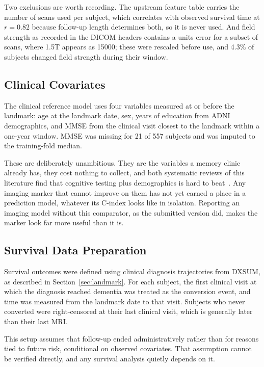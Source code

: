 \documentclass[blue]{ludusofficial}  %
\begin{document}
Two exclusions are worth recording. The upstream feature table carries the number of scans used per subject, which correlates with observed survival time at $r = 0.82$ because follow-up length determines both, so it is never used. And field strength as recorded in the DICOM headers contains a units error for a subset of scans, where 1.5T appears as 15000; these were rescaled before use, and 4.3\% of subjects changed field strength during their window.

\subsection{Clinical Covariates}

The clinical reference model uses four variables measured at or before the landmark: age at the landmark date, sex, years of education from ADNI demographics, and MMSE from the clinical visit closest to the landmark within a one-year window. MMSE was missing for 21 of 557 subjects and was imputed to the training-fold median.

These are deliberately unambitious. They are the variables a memory clinic already has, they cost nothing to collect, and both systematic reviews of this literature find that cognitive testing plus demographics is hard to beat~\cite{ansart2021predicting,grueso2021machine}. Any imaging marker that cannot improve on them has not yet earned a place in a prediction model, whatever its C-index looks like in isolation. Reporting an imaging model without this comparator, as the submitted version did, makes the marker look far more useful than it is.

\subsection{Survival Data Preparation}

Survival outcomes were defined using clinical diagnosis trajectories from DXSUM, as described in Section~\ref{sec:landmark}. For each subject, the first clinical visit at which the diagnosis reached dementia was treated as the conversion event, and time was measured from the landmark date to that visit. Subjects who never converted were right-censored at their last clinical visit, which is generally later than their last MRI.

This setup assumes that follow-up ended administratively rather than for reasons tied to future risk, conditional on observed covariates. That assumption cannot be verified directly, and any survival analysis quietly depends on it.
\end{document}
